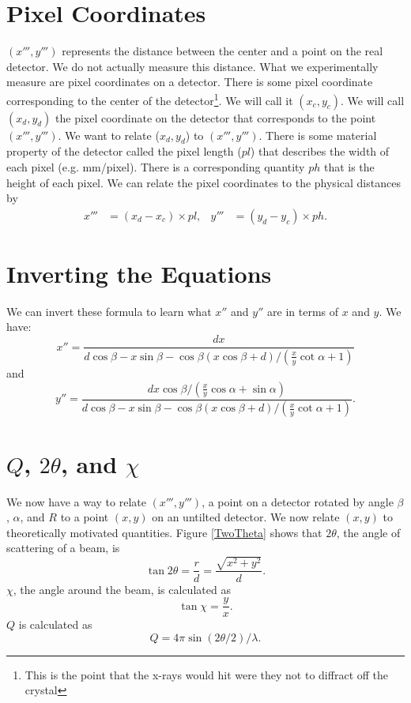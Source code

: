\section{Pixel Coordinates}

$(x''',y''')$ represents the distance between the center 
and a point on the real detector. We do not actually
measure this distance. What we experimentally measure
are pixel coordinates on a detector. There is some pixel 
coordinate corresponding to the center of
the detector\footnote{This is the point that the x-rays would
hit were they not to diffract off the crystal}. We will call 
it $(x_c,y_c)$.  We will call $(x_d,y_d)$ the 
pixel coordinate on the detector
that corresponds to the point $(x''',y''')$.
We want to relate ($x_d,y_d$) to $(x''',y''')$.
There is some material property of the detector 
called the pixel length ($pl$) that describes the width of each pixel
(e.g. \unit[1000]{mm/pixel}). There is a corresponding
quantity $ph$ that is the height of each pixel.
We can relate the pixel coordinates to the physical distances
by
\begin{align}\label{conversionToPixels}
    x'''&=(x_d-x_c) \times pl, &
    y'''&=(y_d-y_c) \times ph.
\end{align}

\section{Inverting the Equations}

We can invert these formula to learn what
$x''$ and $y''$ are in terms of $x$ and $y$.
We have:
\begin{equation}\label{invertx}
    x''=\frac{dx}{d\cos\beta-x\sin\beta-
    \cos\beta(x\cos\beta+d)/(\tfrac{x}{y}\cot\alpha+1)}
\end{equation}
and
\begin{equation}\label{inverty}
    y''=\frac{dx\cos\beta/(\tfrac{x}{y}\cos\alpha+\sin\alpha)}
    {d\cos\beta-x\sin\beta-
    \cos\beta(x\cos\beta+d)/(\tfrac{x}{y}\cot\alpha+1)}.
\end{equation}

\section{\texorpdfstring{$Q$, $2\theta$, and $\chi$}{Q, 2theta, and chi}}

We now have a way to relate $(x''',y''')$, 
a point on a detector rotated by angle $\beta$, 
$\alpha$, and $R$ to a point $(x,y)$
on an untilted detector.
We now relate $(x,y)$ to theoretically motivated 
quantities. Figure \ref{TwoTheta} shows that
$2\theta$, the angle of scattering 
of a beam, is 
\begin{equation}\label{2thetatermsr}
    \tan2\theta = \frac{r}{d} = \frac{\sqrt{x^2+y^2}}{d}.
\end{equation}
$\chi$, the angle around the beam, is calculated as
\begin{equation}\label{chitermsyx}
    \tan\chi = \frac{y}{x}.
\end{equation}
$Q$ is calculated as
\begin{equation}\label{qterms2theta}
    Q = 4\pi \sin(2\theta/2)/\lambda.
\end{equation}

